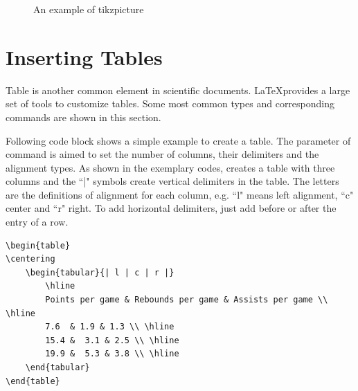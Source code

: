 	\begin{figure}[h!]
		\centering
		\caption{An example of tikzpicture}
		\label{tikzpic}
	\end{figure}
	
\section{Inserting Tables}

	Table is another common element in scientific documents. \LaTeX provides a large set of tools to customize tables. Some most common types and corresponding commands are shown in this section.
	
	Following code block shows a simple example to create a table. The parameter of command {\color{blue}{\verb|tabular|}} is aimed to set the number of columns, their delimiters and the alignment types. As shown in the exemplary codes, {} creates a table with three columns and the ``|" symbols create vertical delimiters in the table. The letters are the definitions of alignment for each column, e.g. ``l" means left alignment, ``c" center and ``r" right. To add horizontal delimiters, just add {\color{blue}{\verb|\hline|}} before or after the entry of a row. 
	
	\begin{lstlisting}
\begin{table}
\centering
	\begin{tabular}{| l | c | r |}
		\hline
		Points per game & Rebounds per game & Assists per game \\ \hline
		7.6  & 1.9 & 1.3 \\ \hline
		15.4 &	3.1	& 2.5 \\ \hline
		19.9 &	5.3 & 3.8 \\ \hline
	\end{tabular}
\end{table}
	\end{lstlisting}
	
